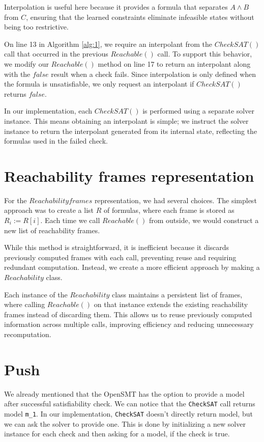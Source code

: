 Interpolation is useful here because it provides a formula that separates $A \land B$ from $C$, ensuring that the learned constraints eliminate infeasible states without being too restrictive.

On line 13 in Algorithm \ref{alg:1}, we require an interpolant from the \( CheckSAT() \) call that occurred in the previous \( Reachable() \) call. To support this behavior, we modify our \( Reachable() \) method on line 17 to return an interpolant along with the \( false \) result when a check fails. Since interpolation is only defined when the formula is unsatisfiable, we only request an interpolant if \( CheckSAT() \) returns \( false \).

In our implementation, each \( CheckSAT() \) is performed using a separate solver instance. This means obtaining an interpolant is simple; we instruct the solver instance to return the interpolant generated from its internal state, reflecting the formulas used in the failed check.

\section*{Reachability frames representation}\label{RFrames}
\noindent For the \( Reachability frames \) representation, we had several choices. The simplest approach was to create a list $R$ of formulas, where each frame is stored as $R_i := R[i]$. Each time we call \( Reachable() \) from outside, we would construct a new list of reachability frames.

While this method is straightforward, it is inefficient because it discards previously computed frames with each call, preventing reuse and requiring redundant computation. Instead, we create a more efficient approach by making a \( Reachability \) class.

Each instance of the \( Reachability \) class  maintains a persistent list of frames, where calling \( Reachable() \) on that instance extends the existing reachability frames instead of discarding them. This allows us to reuse previously computed information across multiple calls, improving efficiency and reducing unnecessary recomputation.

\section*{Push}
We already mentioned that the OpenSMT\cite{OpenSMT} has the option to provide a model after successful satisfiability check.
We can notice that the \texttt{CheckSAT}
call returns model \texttt{m\_1}. In our implementation, \texttt{CheckSAT}
doesn't directly return model, but we can ask the solver to provide one. This
is done by initializing a new solver instance for each check and then asking
for a model, if the check is true.

